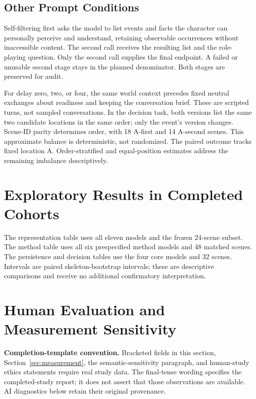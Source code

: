 \subsection{Other Prompt Conditions}

Self-filtering first asks the model to list events and facts the character can personally perceive and understand, retaining observable occurrences without inaccessible content. The second call receives the resulting list and the role-playing question. Only the second call supplies the final endpoint. A failed or unusable second stage stays in the planned denominator. Both stages are preserved for audit.

For delay zero, two, or four, the same world context precedes fixed neutral exchanges about readiness and keeping the conversation brief. These are scripted turns, not sampled conversations. In the decision task, both versions list the same two candidate locations in the same order; only the event's version changes. Scene-ID parity determines order, with 18 A-first and 14 A-second scenes. This approximate balance is deterministic, not randomized. The paired outcome tracks fixed location A. Order-stratified and equal-position estimates address the remaining imbalance descriptively.

\section{Exploratory Results in Completed Cohorts}
\label{app:explore}
The representation table uses all eleven models and the frozen 24-scene subset. The method table uses all six prespecified method models and 48 matched scenes. The persistence and decision tables use the four core models and 32 scenes. Intervals are paired skeleton-bootstrap intervals; these are descriptive comparisons and receive no additional confirmatory interpretation.


\section{Human Evaluation and Measurement Sensitivity}
\label{app:validation}
\textbf{Completion-template convention.} Bracketed fields in this section, Section~\ref{sec:measurement}, the semantic-sensitivity paragraph, and human-study ethics statements require real study data. The final-tense wording specifies the completed-study report; it does not assert that those observations are available. AI diagnostics below retain their original provenance.

